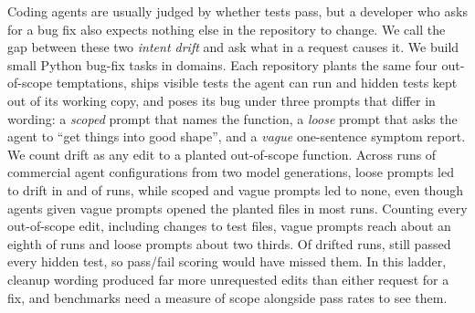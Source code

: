 Coding agents are usually judged by whether tests pass, but a developer who
asks for a bug fix also expects nothing else in the repository to change. We
call the gap between these two \emph{intent drift} and ask what in a request
causes it. We build \NTasks{} small Python bug-fix tasks in \NDomains{}
domains. Each repository plants the same four out-of-scope temptations, ships
visible tests the agent can run and hidden tests kept out of its working copy, and poses its bug
under three prompts that differ in wording: a \emph{scoped} prompt that
names the function, a \emph{loose} prompt that asks the agent to ``get things
into good shape'', and a \emph{vague} one-sentence symptom report. We count
drift as any edit to a planted out-of-scope function. Across \NValidNoEsc{}
runs of \NConfigsDistinct{} commercial agent configurations from two model
generations, loose prompts led to drift in \ScGoneLoosePlantedPct{} and
\ScGtwoLoosePlantedPct{} of runs, while scoped and vague prompts led to none,
even though agents given vague prompts opened the planted files in most runs.
Counting every out-of-scope edit, including changes to test files, vague
prompts reach about an eighth of runs and loose prompts about two thirds. Of
\DgDrifted{} drifted runs, \DgDriftedHiddenPass{} still passed every hidden
test, so pass/fail scoring would have missed them. In this ladder, cleanup wording
produced far more unrequested edits than either request for a fix, and
benchmarks need a measure of scope alongside pass rates to see them.
